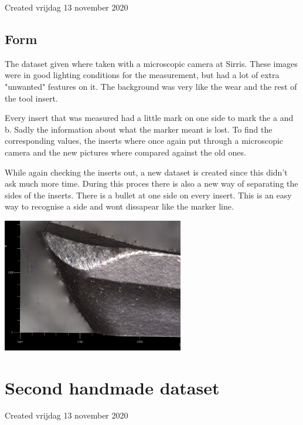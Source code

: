 \documentclass{article}
\begin{document}
Created vrijdag 13 november 2020



\subsection{Form}

The dataset given where taken with a microscopic camera at Sirris. These images were in good lighting conditions for the measurement, but had a lot of extra "unwanted" features on it. The background was very like the wear and the rest of the tool insert. 

Every insert that was measured had a little mark on one side to mark the a and b. Sadly the information about what the marker meant is lost. To find the corresponding values, the inserts where once again put through a microscopic camera and the new pictures where compared against the old ones. 



While again checking the inserts out, a new dataset is created since this didn't ask much more time. During this proces there is also a new way of separating the sides of the inserts. There is a bullet at one side on every insert. This is an easy way to recognise a side and wont dissapear like the marker line. 







\includegraphics[width=3.125000in, keepaspectratio=true]{./ZimFiles_files/Vision/Dataset/handmade_datasets/initial_dataset/initial dataset pictuer.PNG}




		\section{Second handmade dataset}

Created vrijdag 13 november 2020
\end{document}
